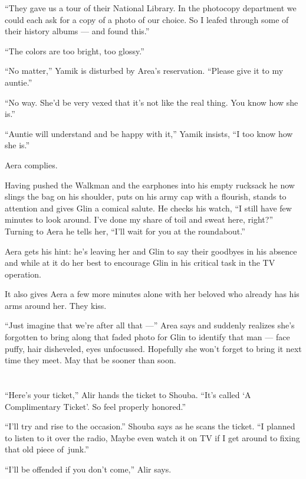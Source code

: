 \documentclass[twoside,11pt,openany]{book}
\begin{document}
``They gave us a tour of their National Library. In the photocopy department we could each ask for a copy
of a photo of our choice. So I leafed through some of their history albums --- and found this.''

``The colors are too bright, too glossy.''

``No matter,'' Yamik is disturbed by Area's reservation. ``Please give it to my
auntie.''

``No way. She'd be very vexed that it's not like the real thing. You know how she is.''

``Auntie will understand and be happy with it,'' Yamik insists, ``I too know how
she is.''

Aera complies.

Having pushed the Walkman and the earphones into his empty rucksack he now slings the bag on his shoulder, puts on his
army cap with a flourish, stands to attention and gives Glin a comical salute. He checks his watch, ``I
still have few minutes to look around. I've done my share of toil and sweat here, right?'' Turning to Aera
he tells her, ``I'll wait for you at the roundabout.''

Aera gets his hint: he's leaving her and Glin to say their goodbyes in his absence and while at it do her best to
encourage Glin in his critical task in the TV operation.

It also gives Aera a few more minutes alone with her beloved who already has his arms around her. They kiss.

``Just imagine that we're after all that ---'' Area says and suddenly realizes she's forgotten
to bring along that faded photo for Glin to identify that man --- face puffy, hair disheveled, eyes unfocussed. Hopefully
she won't forget to bring it next time they meet. May that be sooner than soon.



\chapter{}

``Here's your ticket,'' Alir hands the ticket to Shouba. ``It's called
`A Complimentary Ticket'. So feel properly honored.''

``I'll try and rise to the occasion.'' Shouba says as he scans the ticket. ``I
planned to listen to it over the radio, Maybe even watch it on TV if I get around to fixing that old piece
of~junk.''

``I'll be offended if you don't come,'' Alir says.
\end{document}
